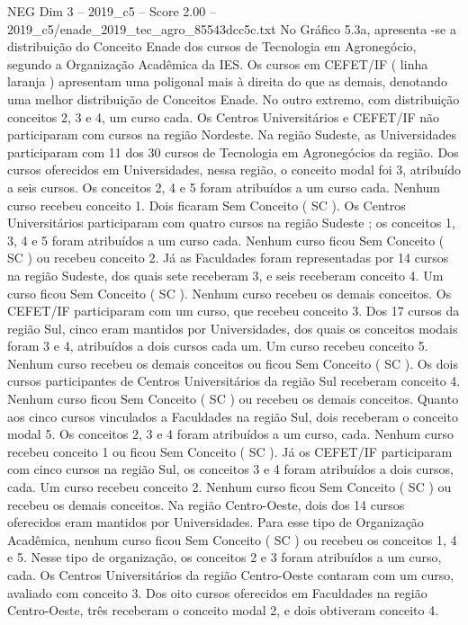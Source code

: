 \begin{textsample}{NEG Dim 3 – 2019\_c5 – Score 2.00 – 2019\_c5/enade\_2019\_tec\_agro\_85543dcc5c.txt}
No Gráfico 5.3a, apresenta -se a distribuição do Conceito Enade dos cursos de Tecnologia em Agronegócio, segundo a Organização Acadêmica da IES.
Os cursos em CEFET/IF ( linha laranja ) apresentam uma poligonal mais à direita do que as demais, denotando uma melhor distribuição de Conceitos Enade.
No outro extremo, com distribuição conceitos 2, 3 e 4, um curso cada.
Os Centros Universitários e CEFET/IF não participaram com cursos na região Nordeste.
Na região Sudeste, as Universidades participaram com 11 dos 30 cursos de Tecnologia em Agronegócios da região.
Dos cursos oferecidos em Universidades, nessa região, o conceito modal foi 3, atribuído a seis cursos.
Os conceitos 2, 4 e 5 foram atribuídos a um curso cada.
Nenhum curso recebeu conceito 1.
Dois ficaram Sem Conceito ( SC ).
Os Centros Universitários participaram com quatro cursos na região Sudeste ; os conceitos 1, 3, 4 e 5 foram atribuídos a um curso cada.
Nenhum curso ficou Sem Conceito ( SC ) ou recebeu conceito 2.
Já as Faculdades foram representadas por 14 cursos na região Sudeste, dos quais sete receberam 3, e seis receberam conceito 4.
Um curso ficou Sem Conceito ( SC ).
Nenhum curso recebeu os demais conceitos.
Os CEFET/IF participaram com um curso, que recebeu conceito 3.
Dos 17 cursos da região Sul, cinco eram mantidos por Universidades, dos quais os conceitos modais foram 3 e 4, atribuídos a dois cursos cada um.
Um curso recebeu conceito 5.
Nenhum curso recebeu os demais conceitos ou ficou Sem Conceito ( SC ).
Os dois cursos participantes de Centros Universitários da região Sul receberam conceito 4.
Nenhum curso ficou Sem Conceito ( SC ) ou recebeu os demais conceitos.
Quanto aos cinco cursos vinculados a Faculdades na região Sul, dois receberam o conceito modal 5.
Os conceitos 2, 3 e 4 foram atribuídos a um curso, cada.
Nenhum curso recebeu conceito 1 ou ficou Sem Conceito ( SC ).
Já os CEFET/IF participaram com cinco cursos na região Sul, os conceitos 3 e 4 foram atribuídos a dois cursos, cada.
Um curso recebeu conceito 2.
Nenhum curso ficou Sem Conceito ( SC ) ou recebeu os demais conceitos.
Na região Centro-Oeste, dois dos 14 cursos oferecidos eram mantidos por Universidades.
Para esse tipo de Organização Acadêmica, nenhum curso ficou Sem Conceito ( SC ) ou recebeu os conceitos 1, 4 e 5.
Nesse tipo de organização, os conceitos 2 e 3 foram atribuídos a um curso, cada.
Os Centros Universitários da região Centro-Oeste contaram com um curso, avaliado com conceito 3.
Dos oito cursos oferecidos em Faculdades na região Centro-Oeste, três receberam o conceito modal 2, e dois obtiveram conceito 4.

\end{textsample}
